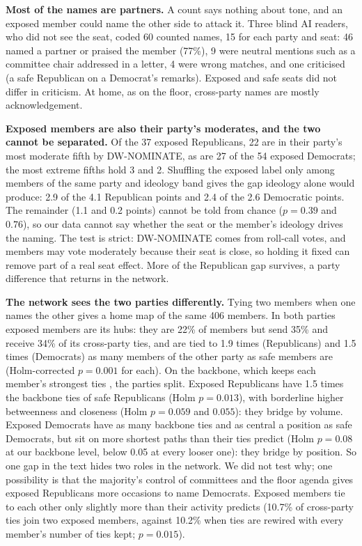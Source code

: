\textbf{Most of the names are partners.} A count says nothing about tone, and an exposed member could name the other side to attack it. Three blind AI readers, who did not see the seat, coded 60 counted names, 15 for each party and seat: 46 named a partner or praised the member (77\%), 9 were neutral mentions such as a committee chair addressed in a letter, 4 were wrong matches, and one criticised (a safe Republican on a Democrat's remarks). Exposed and safe seats did not differ in criticism. At home, as on the floor, cross-party names are mostly acknowledgement.

\textbf{Exposed members are also their party's moderates, and the two cannot be separated.} Of the 37 exposed Republicans, 22 are in their party's most moderate fifth by DW-NOMINATE, as are 27 of the 54 exposed Democrats; the most extreme fifths hold 3 and 2. Shuffling the exposed label only among members of the same party and ideology band gives the gap ideology alone would produce: 2.9 of the 4.1 Republican points and 2.4 of the 2.6 Democratic points. The remainder (1.1 and 0.2 points) cannot be told from chance ($p = 0.39$ and $0.76$), so our data cannot say whether the seat or the member's ideology drives the naming. The test is strict: DW-NOMINATE comes from roll-call votes, and members may vote moderately because their seat is close, so holding it fixed can remove part of a real seat effect. More of the Republican gap survives, a party difference that returns in the network.

\textbf{The network sees the two parties differently.} Tying two members when one names the other gives a home map of the same 406 members. In both parties exposed members are its hubs: they are 22\% of members but send 35\% and receive 34\% of its cross-party ties, and are tied to 1.9 times (Republicans) and 1.5 times (Democrats) as many members of the other party as safe members are (Holm-corrected $p = 0.001$ for each). On the backbone, which keeps each member's strongest ties \cite{serrano2009}, the parties split. Exposed Republicans have 1.5 times the backbone ties of safe Republicans (Holm $p = 0.013$), with borderline higher betweenness and closeness (Holm $p = 0.059$ and $0.055$): they bridge by volume. Exposed Democrats have as many backbone ties and as central a position as safe Democrats, but sit on more shortest paths than their ties predict (Holm $p = 0.08$ at our backbone level, below 0.05 at every looser one): they bridge by position. So one gap in the text hides two roles in the network. We did not test why; one possibility is that the majority's control of committees and the floor agenda gives exposed Republicans more occasions to name Democrats. Exposed members tie to each other only slightly more than their activity predicts (10.7\% of cross-party ties join two exposed members, against 10.2\% when ties are rewired with every member's number of ties kept; $p = 0.015$).

